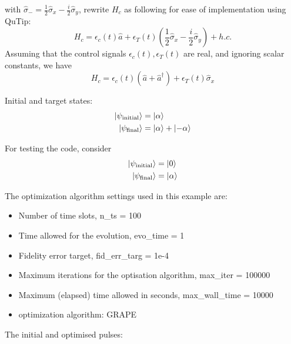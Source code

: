 \documentclass[12pt]{report}
\begin{document}
with $\hat{\sigma}_- = \frac{1}{2} \hat{\sigma}_x - \frac{i}{2}\hat{\sigma}_y$, 
rewrite $H_c$ as following for ease of implementation using QuTip:
\begin{equation}
    H_c = \epsilon_c(t) \hat{a} + \epsilon_T(t) (\frac{1}{2} \hat{\sigma}_x - \frac{i}{2}\hat{\sigma}_y) + h.c.
\end{equation}
Assuming that the control signals $\epsilon_c(t), \epsilon_T(t)$ are real, and ignoring scalar constants, we have 
$$
H_c = \epsilon_c(t) (\hat{a}+\hat{a}^{\dagger}) + \epsilon_T(t) \hat{\sigma}_x
$$

Initial and target states: 
\begin{equation}
    \begin{aligned}
    \ket{\psi_{\text{initial}}} &= \ket{\alpha} \\
    \ket{\psi_{\text{final}}} &= \ket{\alpha} + \ket{-\alpha}
\end{aligned}
\end{equation}


For testing the code, consider
\begin{equation}
    \begin{aligned}
        \ket{\psi_{\text{initial}}} &= \ket{0} \\
        \ket{\psi_{\text{final}}} &= \ket{\alpha}
    \end{aligned}
\end{equation}


The optimization algorithm settings used in this example are: 
\begin{itemize}
    \item Number of time slots, n\_ts = 100
    \item Time allowed for the evolution, evo\_time = 1
    \item Fidelity error target, fid\_err\_targ = 1e-4
    \item Maximum iterations for the optisation algorithm, max\_iter = 100000
    \item Maximum (elapsed) time allowed in seconds, max\_wall\_time = 10000
    \item optimization algorithm: GRAPE
\end{itemize}

The initial and optimised pulses:
\end{document}
